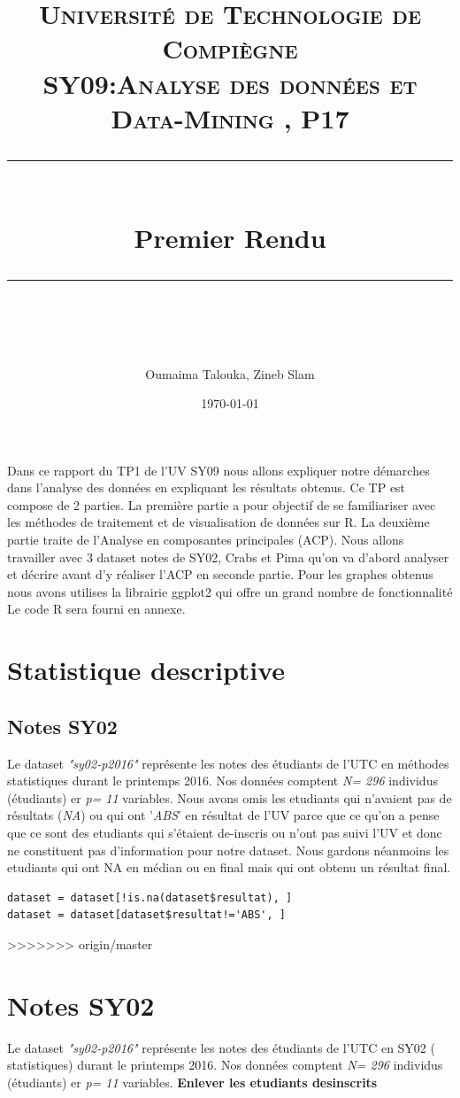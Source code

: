 \documentclass[10pt]{article}
\title{
	\normalfont \normalsize 
	\textsc{Université de Technologie de Compiègne\\ 
		SY09:Analyse des données et Data-Mining , P17} \\
	[10pt] 
	\rule{\linewidth}{0.5pt} \\[6pt] 
	\huge Premier Rendu \\
	\rule{\linewidth}{2pt}  \\[10pt]
}
\author{Oumaima Talouka, Zineb Slam}
\date{\normalsize \today}
\begin{document}
	
{\let\newpage\relax\maketitle}

Dans ce rapport du TP1 de l'UV SY09 nous allons expliquer notre démarches dans l'analyse des données en expliquant les résultats obtenus. Ce TP est compose de 2 parties. La première partie a pour objectif de se familiariser avec les méthodes de traitement et de visualisation de données sur R. La deuxième partie traite de l'Analyse en composantes principales (ACP). Nous allons travailler avec 3 dataset notes de SY02, Crabs et Pima qu'on va d'abord analyser et décrire avant d'y réaliser l'ACP en seconde partie. Pour les graphes obtenus nous avons utilises la librairie ggplot2 qui offre un grand nombre de fonctionnalité Le code R sera fourni en annexe.



\tableofcontents


\section{ Statistique descriptive}

\subsection{Notes SY02}
Le dataset \textit{"sy02-p2016"} représente les notes des étudiants de l'UTC en méthodes statistiques durant le printemps 2016. Nos données comptent \textit{N= 296} individus (étudiants) er \textit{p= 11} variables. Nous avons omis  les etudiants qui n'avaient pas de résultats (\textit{NA}) ou qui ont '\textit{ABS}' en résultat de l'UV parce que ce qu'on a pense que ce sont des etudiants qui s'étaient de-inscris ou n'ont pas suivi l'UV et donc ne constituent pas d'information pour notre dataset. Nous gardons néanmoins les etudiants qui ont NA en médian ou en final mais qui ont obtenu un résultat final. 

\begin{lstlisting}
dataset = dataset[!is.na(dataset$resultat), ]
dataset = dataset[dataset$resultat!='ABS', ]
\end{lstlisting}
>>>>>>> origin/master

\section{Notes SY02}
Le dataset \textit{"sy02-p2016"} représente les notes des étudiants de l'UTC en SY02 ( statistiques) durant le printemps 2016. Nos données comptent \textit{N= 296} individus (étudiants) er \textit{p= 11} variables.  \textbf{Enlever les etudiants desinscrits}
\end{document}
